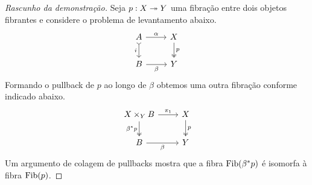 \begin{proof}[Rascunho da demonstração]
  Seja $p: X \twoheadrightarrow Y$ uma fibração entre dois objetos fibrantes e considere o problema de levantamento abaixo.
  \begin{displaymath}
    \begin{tikzcd}
      A
      \arrow[r, "\alpha"]
      \arrow[d, tail, "i" swap]
      & X
      \arrow[d, two heads, "p"]
      \\ B
      \arrow[r, "\beta" swap]
      & Y
    \end{tikzcd}
  \end{displaymath}
  Formando o pullback de $p$ ao longo de $\beta$ obtemos uma outra fibração conforme indicado abaixo.
  \begin{displaymath}
    \begin{tikzcd}
      X \times_{Y} B
      \arrow[r, "\pi_{1}"]
      \arrow[d, two heads, "\beta^{*}p" swap]
      & X
      \arrow[d, two heads, "p"]
      \\ B
      \arrow[r, "\beta" swap]
      & Y
    \end{tikzcd}
  \end{displaymath}
  Um argumento de colagem de pullbacks mostra que a fibra $\mathrm{Fib}(\beta^{*}p)$ é isomorfa à fibra $\mathrm{Fib}(p)$.


\end{proof}
